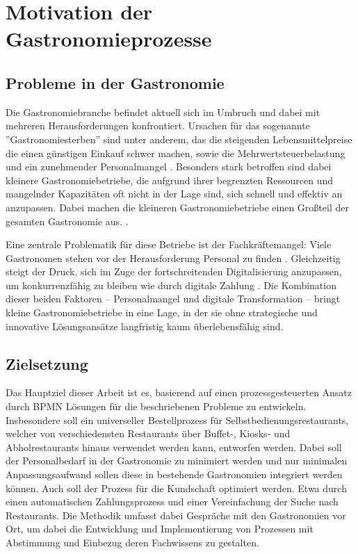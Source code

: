 \section{Motivation der Gastronomieprozesse}
\subsection{Probleme in der Gastronomie}
Die Gastronomiebranche befindet aktuell sich im Umbruch und dabei mit mehreren Herausforderungen konfrontiert. Ursachen für das sogenannte ''Gastronomiesterben'' sind unter anderem, das die steigenden Lebensmittelpreise die einen günstigen Einkauf schwer machen, sowie die Mehrwertsteuerbelastung und ein zunehmender Personalmangel \parencite[Vgl.]{noauthor_systemgastronomie_nodate} \parencite[Vgl.]{noauthor_catering_nodate}. Besonders stark betroffen sind dabei kleinere Gastronomiebetriebe, die aufgrund ihrer begrenzten Ressourcen und mangelnder Kapazitäten oft nicht in der Lage sind, sich schnell und effektiv an anzupassen. \cite{aufweisen_themenseite_nodate} Dabei machen die kleineren Gastronomiebetriebe einen Großteil der gesamten Gastronomie aus. \parencite{gruner_deutsche_2016}.

Eine zentrale Problematik für diese Betriebe ist der Fachkräftemangel: Viele Gastronomen stehen vor der Herausforderung Personal zu finden \parencite[Vgl.]{noauthor_systemgastronomie_nodate}. Gleichzeitig steigt der Druck, sich im Zuge der fortschreitenden Digitalisierung anzupassen, um konkurrenzfähig zu bleiben wie durch digitale Zahlung \cite{aufweisen_themenseite_nodate}. Die Kombination dieser beiden Faktoren – Personalmangel und digitale Transformation – bringt kleine Gastronomiebetriebe in eine Lage, in der sie ohne strategische und innovative Lösungsansätze langfristig kaum überlebensfähig sind.

\subsection{Zielsetzung}
Das Hauptziel dieser Arbeit ist es, basierend auf einen prozessgesteuerten Ansatz durch BPMN Lösungen für die beschriebenen Probleme zu entwickeln.
Insbesondere soll ein universeller Bestellprozess für Selbstbedienungsrestaurants, welcher von verschiedensten Restaurants über Buffet-, Kiosks- und Abholrestaurants hinaus verwendet werden kann, entworfen werden. Dabei soll der Personalbedarf in der Gastronomie zu minimiert werden und nur minimalen Anpassungsaufwand sollen diese in bestehende Gastronomien integriert werden können.
Auch soll der Prozess für die Kundschaft optimiert werden. Etwa durch einen automatischen Zahlungsprozess und einer Vereinfachung der Suche nach Restaurants.
Die Methodik umfasst dabei Gespräche mit den Gastronomien vor Ort, um dabei die Entwicklung und Implementierung von Prozessen mit Abstimmung und Einbezug deren Fachwissens zu gestalten.

